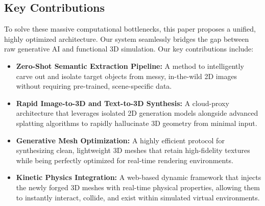 \subsection{Key Contributions}
To solve these massive computational bottlenecks, this paper proposes a unified, highly optimized architecture. Our system seamlessly bridges the gap between raw generative AI and functional 3D simulation. Our key contributions include:

\begin{itemize}
    \item \textbf{Zero-Shot Semantic Extraction Pipeline:} A method to intelligently carve out and isolate target objects from messy, in-the-wild 2D images without requiring pre-trained, scene-specific data.
    \item \textbf{Rapid Image-to-3D and Text-to-3D Synthesis:} A cloud-proxy architecture that leverages isolated 2D generation models alongside advanced splatting algorithms to rapidly hallucinate 3D geometry from minimal input.
    \item \textbf{Generative Mesh Optimization:} A highly efficient protocol for synthesizing clean, lightweight 3D meshes that retain high-fidelity textures while being perfectly optimized for real-time rendering environments.
    \item \textbf{Kinetic Physics Integration:} A web-based dynamic framework that injects the newly forged 3D meshes with real-time physical properties, allowing them to instantly interact, collide, and exist within simulated virtual environments.
\end{itemize}
